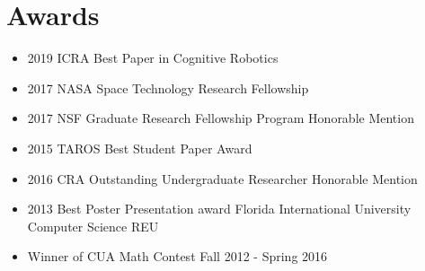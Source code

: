 \section{Awards}

\vspace{6pt}

\begin{itemize}

\item[]{2019 ICRA Best Paper in Cognitive Robotics}

\vspace{6pt}

\item[]{2017 NASA Space Technology Research Fellowship}

\vspace{6pt}

\item[]{2017 NSF Graduate Research Fellowship Program Honorable Mention}

\vspace{6pt}

\item[]{2015 TAROS Best Student Paper Award}

\vspace{6pt}

\item[]{2016 CRA Outstanding Undergraduate Researcher Honorable Mention}

\vspace{6pt}

\item[]{2013 Best Poster Presentation award Florida International University Computer Science REU}

\vspace{6pt}

\item[]{Winner of CUA Math Contest Fall 2012 - Spring 2016}

\end{itemize}